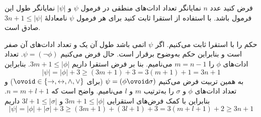فرض کنید عدد $n$ نمایانگر تعداد ادات‌های منطقی در فرمول $\psi$ و $|\psi|$ نمایانگر طول این فرمول باشد. با استفاده از استقرا ثابت کنید برای هر فرمول $\psi$ نامعادلهٔ
$3n+1\leq|\psi|$ صادق است.
\begin{ans}
حکم را با استقرا ثابت می‌کنیم. اگر $\psi$ اتمی باشد طول آن یک و تعداد ادات‌های آن صفر است و بنابراین حکم به‌وضوح برقرار است. حال فرض می‌کنیم
$\psi=(\neg\phi)$.
تعداد ادات‌های $\phi$ را $m=n-1$ می‌نامیم. بنا بر فرض استقرا داریم
$3m+1\leq|\phi|$.
بنابراین
$$
|\psi|=|\phi|+3\geq(3m+1)+3=3(m+1)+1=3n+1
$$
به همین تربیت فرض می‌کنیم
$\psi=(\phi\ovoid\sigma)$
(برای
$\ovoid\in\{\to,\leftrightarrow,\wedge,\vee\}$)
و تعداد ادات‌های $\phi$ و $\sigma$ را به‌ترتیب $m$ و $l$ می‌نامیم. واضح است که $n=m+l+1$. بنابراین با کمک فرض‌های استقرایی
$3m+1\leq|\phi|$
و
$3l+1\leq|\sigma|$
داریم
$$|\psi|=|\phi|+|\sigma|+3\geq(3m+1)+(3l+1)+3=3(m+l+1)+2\geq3n+1$$
\end{ans}
